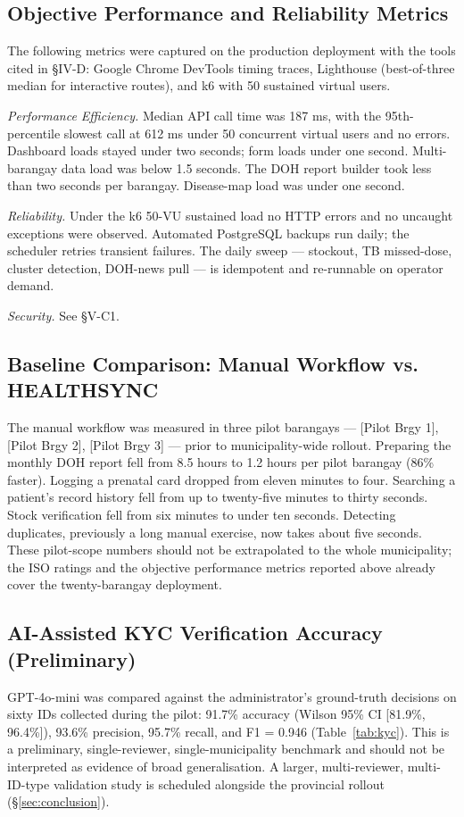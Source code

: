 \documentclass[conference]{IEEEtran}
\begin{document}
\subsection{Objective Performance and Reliability Metrics}
The following metrics were captured on the production deployment with the tools cited in \S IV-D: Google Chrome DevTools timing traces, Lighthouse (best-of-three median for interactive routes), and k6 with 50 sustained virtual users.

\textit{Performance Efficiency.} Median API call time was 187 ms, with the 95th-percentile slowest call at 612 ms under 50 concurrent virtual users and no errors. Dashboard loads stayed under two seconds; form loads under one second. Multi-barangay data load was below 1.5 seconds. The DOH report builder took less than two seconds per barangay. Disease-map load was under one second.

\textit{Reliability.} Under the k6 50-VU sustained load no HTTP errors and no uncaught exceptions were observed. Automated PostgreSQL backups run daily; the scheduler retries transient failures. The daily sweep --- stockout, TB missed-dose, cluster detection, DOH-news pull --- is idempotent and re-runnable on operator demand.

\textit{Security.} See \S V-C1.

\subsection{Baseline Comparison: Manual Workflow vs. HEALTHSYNC}
The manual workflow was measured in three pilot barangays --- [Pilot Brgy 1], [Pilot Brgy 2], [Pilot Brgy 3] --- prior to municipality-wide rollout. Preparing the monthly DOH report fell from 8.5 hours to 1.2 hours per pilot barangay (86\% faster). Logging a prenatal card dropped from eleven minutes to four. Searching a patient's record history fell from up to twenty-five minutes to thirty seconds. Stock verification fell from six minutes to under ten seconds. Detecting duplicates, previously a long manual exercise, now takes about five seconds. These pilot-scope numbers should not be extrapolated to the whole municipality; the ISO ratings and the objective performance metrics reported above already cover the twenty-barangay deployment.

\subsection{AI-Assisted KYC Verification Accuracy (Preliminary)}
GPT-4o-mini was compared against the administrator's ground-truth decisions on sixty IDs collected during the pilot: 91.7\% accuracy (Wilson 95\% CI [81.9\%, 96.4\%]), 93.6\% precision, 95.7\% recall, and F1 = 0.946 (Table~\ref{tab:kyc}). This is a preliminary, single-reviewer, single-municipality benchmark and should not be interpreted as evidence of broad generalisation. A larger, multi-reviewer, multi-ID-type validation study is scheduled alongside the provincial rollout (\S\ref{sec:conclusion}).
\end{document}

